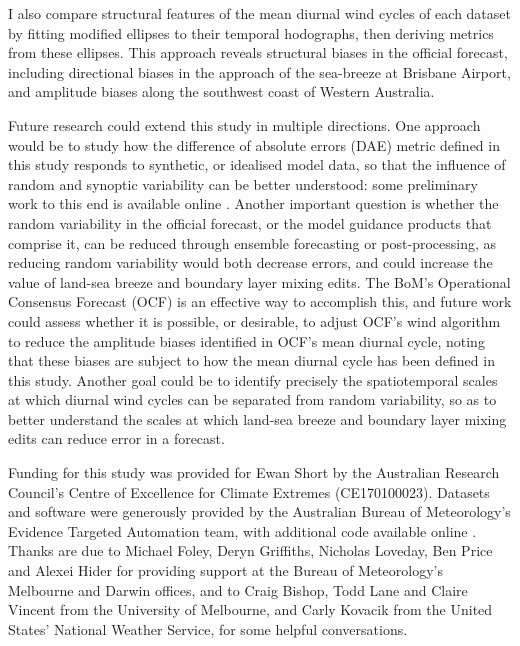 \documentclass{ametsoc}
\begin{document}
I also compare structural features of the mean diurnal wind cycles of each dataset by fitting modified ellipses to their temporal hodographs, then deriving metrics from these ellipses. This approach reveals structural biases in the official forecast, including directional biases in the approach of the sea-breeze at Brisbane Airport, and amplitude biases along the southwest coast of Western Australia.

Future research could extend this study in multiple directions.  One approach would be to study how the difference of absolute errors (DAE) metric defined in this study responds to synthetic, or idealised model data, so that the influence of random and synoptic variability can be better understood: some preliminary work to this end is available online \citep{short20}. Another important question is whether the random variability in the official forecast, or the model guidance products that comprise it, can be reduced through ensemble forecasting or post-processing, as reducing random variability would both decrease errors, and could increase the value of land-sea breeze and boundary layer mixing edits. The BoM's Operational Consensus Forecast (OCF) is an effective way to accomplish this, and future work could assess whether it is possible, or desirable, to adjust OCF's wind algorithm to reduce the amplitude biases identified in OCF's mean diurnal cycle, noting that these biases are subject to how the mean diurnal cycle has been defined in this study. Another goal could be to identify precisely the spatiotemporal scales at which diurnal wind cycles can be separated from random variability, so as to better understand the scales at which land-sea breeze and boundary layer mixing edits can reduce error in a forecast.

\acknowledgments
Funding for this study was provided for Ewan Short by the Australian Research Council's Centre of Excellence for Climate Extremes (CE170100023). Datasets and software were generously provided by the Australian Bureau of Meteorology's Evidence Targeted Automation team, with additional code available online \citep{shortGitVeri19}. Thanks are due to Michael Foley, Deryn Griffiths, Nicholas Loveday, Ben Price and Alexei Hider for providing support at the Bureau of Meteorology's Melbourne and Darwin offices, and to Craig Bishop, Todd Lane and Claire Vincent from the University of Melbourne, and Carly Kovacik from the United States' National Weather Service, for some helpful conversations. 



\end{document}
